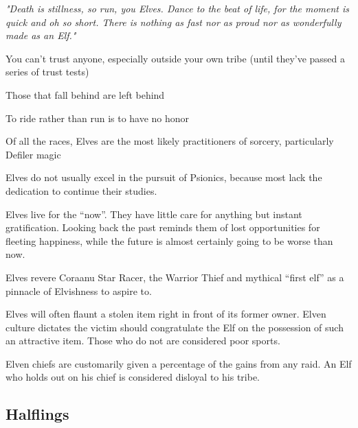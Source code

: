 \begin{description}
    \item \textit{"Death is stillness, so run, you Elves. Dance to the beat of life, for the moment is quick and oh so short. There is nothing as fast nor as proud nor as wonderfully made as an Elf."}
    \item You can’t trust anyone, especially outside your own tribe (until they’ve passed a series of trust tests)
    \item Those that fall behind are left behind
    \item To ride rather than run is to have no honor
    \item Of all the races, Elves are the most likely practitioners of sorcery, particularly Defiler magic
    \item Elves do not usually excel in the pursuit of Psionics, because most lack the dedication to continue their studies.
    \item Elves live for the “now”. They have little care for anything but instant gratification. Looking back the past reminds them of lost opportunities for fleeting happiness, while the future is almost certainly going to be worse than now.
    \item Elves revere Coraanu Star Racer, the Warrior Thief and mythical “first elf” as a pinnacle of Elvishness to aspire to.
    \item Elves will often flaunt a stolen item right in front of its former owner. Elven culture dictates the victim should congratulate the Elf on the possession of such an attractive item. Those who do not are considered poor sports.
    \item Elven chiefs are customarily given a percentage of the gains from any raid. An Elf who holds out on his chief is considered disloyal to his tribe.
\end{description}

\subsection{Halflings}

